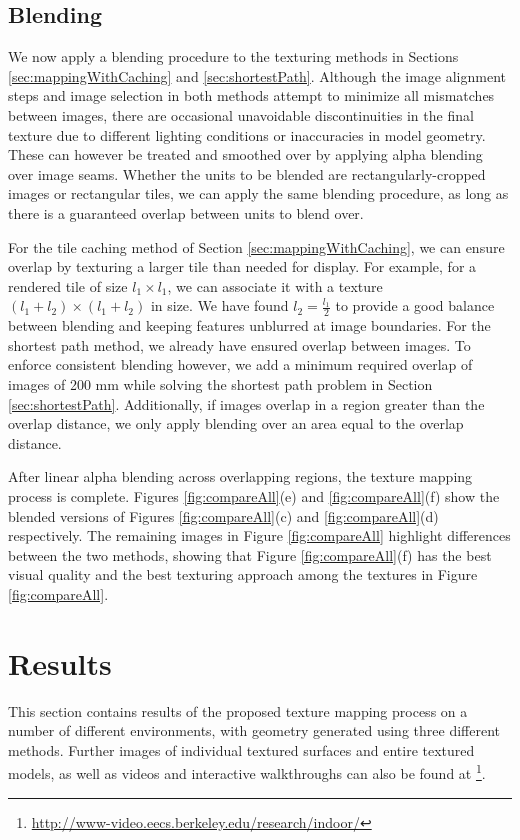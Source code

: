 \documentclass[]{spie}  %
\begin{document}
\subsection{Blending}
\label{sec:blending}
We now apply a blending procedure to the texturing methods in Sections
\ref{sec:mappingWithCaching} and \ref{sec:shortestPath}. Although the
image alignment steps and image selection in both methods attempt to
minimize all mismatches between images, there are occasional
unavoidable discontinuities in the final texture due to different
lighting conditions or inaccuracies in model geometry. These can
however be treated and smoothed over by applying alpha blending over
image seams.  Whether the units to be blended are
rectangularly-cropped images or rectangular tiles, we can apply the
same blending procedure, as long as there is a guaranteed overlap
between units to blend over.

For the tile caching method of Section \ref{sec:mappingWithCaching},
we can ensure overlap by texturing a larger tile than needed for
display. For example, for a rendered tile of size $l_1 \times l_1$, we
can associate it with a texture $(l_1 + l_2) \times (l_1 + l_2)$ in
size.  We have found $l_2 = \frac{l_1}{2}$ to provide a good balance
between blending and keeping features unblurred at image
boundaries. For the shortest path method, we already have ensured
overlap between images. To enforce consistent blending however, we add
a minimum required overlap of images of 200 mm while solving the
shortest path problem in Section \ref{sec:shortestPath}. Additionally,
if images overlap in a region greater than the overlap distance, we
only apply blending over an area equal to the overlap distance.

After linear alpha blending across overlapping regions, the texture
mapping process is complete. Figures \ref{fig:compareAll}(e) and
\ref{fig:compareAll}(f) show the blended versions of Figures
\ref{fig:compareAll}(c) and \ref{fig:compareAll}(d) respectively. The
remaining images in Figure \ref{fig:compareAll} highlight differences
between the two methods, showing that Figure \ref{fig:compareAll}(f)
has the best visual quality and the best texturing approach among the
textures in Figure \ref{fig:compareAll}.



\section{Results}
\label{sec:results}
This section contains results of the proposed texture mapping process
on a number of different environments, with geometry generated using
three different methods. Further images of individual textured
surfaces and entire textured models, as well as videos and interactive
walkthroughs can also be found at
\footnote{\url{http://www-video.eecs.berkeley.edu/research/indoor/}}.
\end{document}
